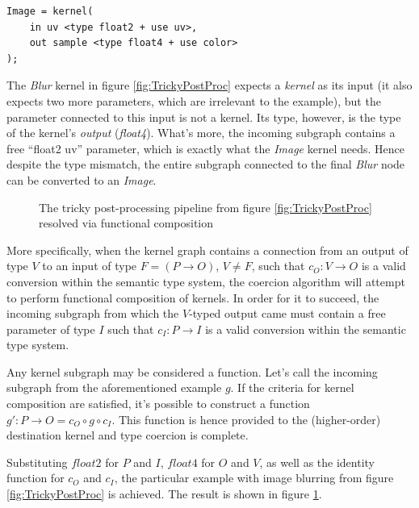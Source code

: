 \begin{lstlisting}[frame=single]
Image = kernel(
    in uv <type float2 + use uv>,
    out sample <type float4 + use color>
);
\end{lstlisting}

The \emph{Blur} kernel in figure \ref{fig:TrickyPostProc} expects a \emph{kernel} as its input (it also expects two more parameters, which are irrelevant to the example), but the parameter connected to this input is not a kernel. Its type, however, is the type of the kernel's \emph{output} (\emph{float4}). What's more, the incoming subgraph contains a free ``float2 uv'' parameter, which is exactly what the \emph{Image} kernel needs. Hence despite the type mismatch, the entire subgraph connected to the final \emph{Blur} node can be converted to an \emph{Image}.

\begin{figure}[h!]
  \centering
    \caption[The tricky post-processing pipeline resolved]{The tricky post-processing pipeline from figure \ref{fig:TrickyPostProc} resolved via functional composition}
  \label{fig:TrickyPostProcResolve}
\end{figure}

More specifically, when the kernel graph contains a connection from an output of type $V$ to an input of type $F = (P \rightarrow O)$, $V \neq F$, such that $c_O : V \rightarrow O$ is a valid conversion within the semantic type system, the coercion algorithm will attempt to perform functional composition of kernels. In order for it to succeed, the incoming subgraph from which the $V$-typed output came must contain a free parameter of type $I$ such that $c_I : P \rightarrow I$ is a valid conversion within the semantic type system.

Any kernel subgraph may be considered a function. Let's call the incoming subgraph from the aforementioned example $g$. If the criteria for kernel composition are satisfied, it's possible to construct a function $g\prime : P \rightarrow O = c_O \circ g \circ c_I$. This function is hence provided to the (higher-order) destination kernel and type coercion is complete.

Substituting $float2$ for $P$ and $I$, $float4$ for $O$ and $V$, as well as the identity function for $c_O$ and $c_I$, the particular example with image blurring from figure \ref{fig:TrickyPostProc} is achieved. The result is shown in figure \ref{fig:TrickyPostProcResolve}.

